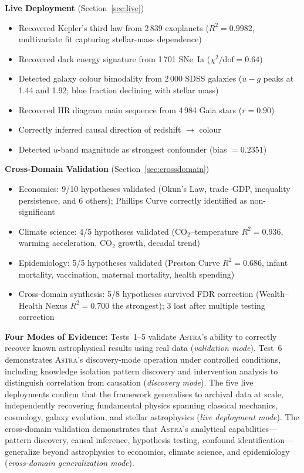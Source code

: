 \documentclass[usenatbib]{rasti}
\newcommand{\astra}{\textsc{Astra}\xspace}
\begin{document}
\textbf{Live Deployment} (Section~\ref{sec:live})
\begin{itemize}
  \item Recovered Kepler's third law from 2\,839 exoplanets ($R^{2}=0.9982$, multivariate fit capturing stellar-mass dependence)
  \item Recovered dark energy signature from 1\,701 SNe~Ia ($\chi^{2}/\mathrm{dof}=0.64$)
  \item Detected galaxy colour bimodality from 2\,000 SDSS galaxies ($u{-}g$ peaks at 1.44 and 1.92; blue fraction declining with stellar mass)
  \item Recovered HR diagram main sequence from 4\,984 Gaia stars ($r=0.90$)
  \item Correctly inferred causal direction of redshift $\rightarrow$ colour
  \item Detected $u$-band magnitude as strongest confounder (bias $= 0.2351$)
\end{itemize}

\textbf{Cross-Domain Validation} (Section~\ref{sec:crossdomain})
\begin{itemize}
  \item Economics: 9/10 hypotheses validated (Okun's Law, trade--GDP, inequality persistence, and 6 others); Phillips Curve correctly identified as non-significant
  \item Climate science: 4/5 hypotheses validated (CO$_{2}$--temperature $R^{2}=0.936$, warming acceleration, CO$_{2}$ growth, decadal trend)
  \item Epidemiology: 5/5 hypotheses validated (Preston Curve $R^{2}=0.686$, infant mortality, vaccination, maternal mortality, health spending)
  \item Cross-domain synthesis: 5/8 hypotheses survived FDR correction (Wealth--Health Nexus $R^{2}=0.700$ the strongest); 3 lost after multiple testing correction
\end{itemize}

\textbf{Four Modes of Evidence:}
Tests~1--5 validate \astra's ability to correctly recover known astrophysical results using real data (\emph{validation mode}).
Test~6 demonstrates \astra's discovery-mode operation under controlled conditions, including knowledge isolation pattern discovery and intervention analysis to distinguish correlation from causation (\emph{discovery mode}).
The five live deployments confirm that the framework generalises to archival data at scale, independently recovering fundamental physics spanning classical mechanics, cosmology, galaxy evolution, and stellar astrophysics (\emph{live deployment mode}).
The cross-domain validation demonstrates that \astra's analytical capabilities---pattern discovery, causal inference, hypothesis testing, confound identification---generalize beyond astrophysics to economics, climate science, and epidemiology (\emph{cross-domain generalization mode}).
\end{document}
